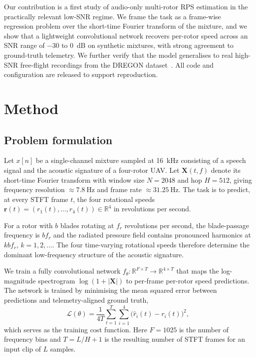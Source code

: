 \documentclass{QD_2026}
\begin{document}
Our contribution is a first study of audio-only multi-rotor RPS estimation in
the practically relevant low-SNR regime. We frame the task as a frame-wise
regression problem over the short-time Fourier transform of the mixture, and we
show that a lightweight convolutional network recovers per-rotor speed across
an SNR range of $-30$ to $0$~dB on synthetic mixtures,
with strong agreement to ground-truth telemetry. We further verify that the
model generalises to real high-SNR free-flight recordings from the DREGON
dataset~\cite{strauss2018dregon}. All code and configuration are released to
support reproduction.

\section{Method}
\label{sec:method}

\subsection{Problem formulation}

Let $x[n]$ be a single-channel mixture sampled at \SI{16}{\kilo\hertz} consisting of a
speech signal and the acoustic signature of a four-rotor UAV.
Let $\mathbf{X}(t, f)$ denote its short-time Fourier transform with window size
$N = 2048$ and hop $H = 512$, giving frequency resolution $\approx \SI{7.8}{\hertz}$ and
frame rate $\approx \SI{31.25}{\hertz}$.
The task is to predict, at every STFT frame $t$, the four rotational speeds
$\mathbf{r}(t) = (r_{1}(t), \dots, r_{4}(t)) \in \mathbb{R}^{4}$ in revolutions
per second.

For a rotor with $b$ blades rotating at $f_{r}$ revolutions per second, the
blade-passage frequency is $b f_{r}$ and the radiated pressure field contains
pronounced harmonics at $k b f_{r}$, $k = 1, 2, \dots$.
The four time-varying rotational speeds therefore determine the dominant
low-frequency structure of the acoustic signature.

We train a fully convolutional network $f_{\theta}: \mathbb{R}^{F \times T} \to \mathbb{R}^{4 \times T}$
that maps the log-magnitude spectrogram $\log(1 + |\mathbf{X}|)$ to per-frame per-rotor
speed predictions. The network is trained by minimising the mean squared error
between predictions and telemetry-aligned ground truth,
\begin{equation}
  \mathcal{L}(\theta)
    = \frac{1}{4T}\sum_{t=1}^{T}\sum_{i=1}^{4}
      \bigl(\hat{r}_{i}(t) - r_{i}(t)\bigr)^{2},
\end{equation}
which serves as the training cost function.
Here $F = 1025$ is the number of frequency bins and $T = L/H + 1$ is the
resulting number of STFT frames for an input clip of $L$ samples.
\end{document}
